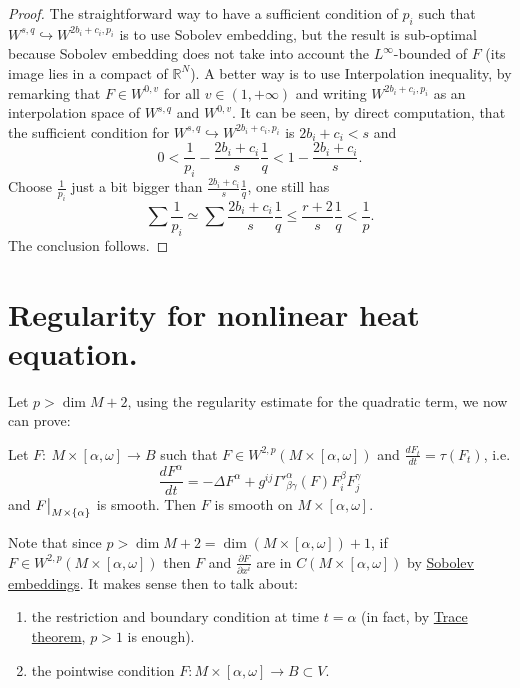 \begin{proof}
The straightforward way to have a sufficient condition of \(p_i\) such that \(W^{s,q}
\hookrightarrow W^{2b_i+c_i,p_i}\) is to use Sobolev embedding, but the result is sub-optimal
because Sobolev embedding does not take into account the \(L^\infty\)-bounded of \(F\) (its image lies in a compact of \(\mathbb{R}^N\)). A better way is to use
Interpolation inequality, by remarking that \(F\in W^{0,v}\) for all \(v\in (1,+\infty)\) and writing \(W^{2b_i+c_i, p_i}\) as an interpolation space of \(W^{s,q}\) and \(W^{0,v}\). It can be seen, by direct computation, that the sufficient condition for \(W^{s,q}
\hookrightarrow W^{2b_i+c_i,p_i}\) is \(2b_i+c_i < s\) and
\[
 0 < \frac{1}{p_i} - \frac{2b_i+c_i}{s}\frac{1}{q} < 1 - \frac{2b_i + c_i}{s}.
\]
Choose \(\frac{1}{p_i}\) just a bit bigger than \(\frac{2b_i+c_i}{s}\frac{1}{q}\), one
still has
\[
\sum \frac{1}{p_i} \simeq \sum  \frac{2b_i+c_i}{s}\frac{1}{q} \leq \frac{r+2}{s}\frac{1}{q} < \frac{1}{p}.
\]
The conclusion follows.  
\end{proof}



\section{Regularity for nonlinear heat equation.}
\label{sec:org703224a}
Let \(p>\dim M + 2\), using the regularity estimate for the quadratic term, we now can prove:

\begin{theorem}
\label{thm:reg-nonlin-heat}
Let \(F:\ M\times [\alpha,\omega] \longrightarrow B\) such that \(F\in W^{2,p}(M\times
[\alpha,\omega])\) and \(\frac{d F_t}{dt} = \tau(F_t)\), i.e.
\[
 \frac{d F^\alpha}{dt} = -\Delta F^\alpha + g^{ij}\Gamma'^\alpha_{\beta\gamma}(F)
F^\beta_i F^\gamma_j
\]
and \(\restr{F}{M\times\{\alpha\}}\) is smooth. Then \(F\) is smooth on \(M\times [\alpha,\omega]\).
\end{theorem}

\begin{remark}
Note that since \(p > \dim M + 2 = \dim (M\times [\alpha,\omega])+1\), if \(F\in
W^{2,p}(M\times[\alpha,\omega])\) then \(F\) and \(\frac{\partial F}{\partial
x^i}\) are in \(C(M\times[\alpha,\omega])\) by \href{sobolev-riemannian.org}{Sobolev embeddings}. It makes sense then to talk
about:
\begin{enumerate}
\item the restriction and boundary condition at time \(t=\alpha\) (in fact, by \href{interpolation-sobolev.org}{Trace theorem}, \(p>1\) is enough).
\item the pointwise condition \(F: M\times [\alpha,\omega] \longrightarrow
   B\subset V\).
\end{enumerate}
\end{remark}


